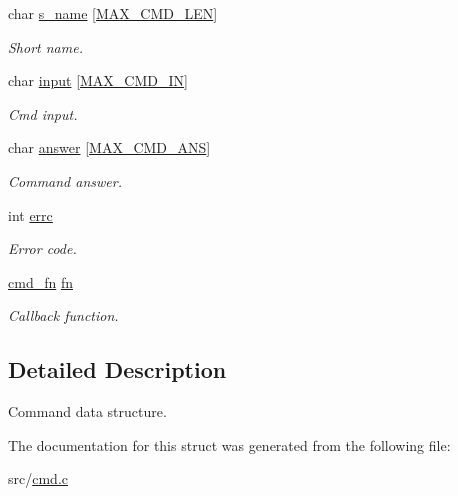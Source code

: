 \begin{DoxyCompactItemize}
\mbox{\label{struct__Cmd_ac7a8c09e258cb2b2f63d179943616d08}} 
char \hyperlink{struct__Cmd_ac7a8c09e258cb2b2f63d179943616d08}{s\+\_\+name} \mbox{[}\hyperlink{cmd_8h_a1eb73c104b484cf18752169509cebfe2}{M\+A\+X\+\_\+\+C\+M\+D\+\_\+\+L\+EN}\mbox{]}
\begin{DoxyCompactList}\small\item\em Short name. \end{DoxyCompactList}\item 
\mbox{\label{struct__Cmd_a3d023ded28ab2b9ec8daae3ebf1a3759}} 
char \hyperlink{struct__Cmd_a3d023ded28ab2b9ec8daae3ebf1a3759}{input} \mbox{[}\hyperlink{cmd_8h_a536329c6bdf286710c20c6dd9a0750cc}{M\+A\+X\+\_\+\+C\+M\+D\+\_\+\+IN}\mbox{]}
\begin{DoxyCompactList}\small\item\em Cmd input. \end{DoxyCompactList}\item 
\mbox{\label{struct__Cmd_a143c62700ed611e1ff0d70611c76fa55}} 
char \hyperlink{struct__Cmd_a143c62700ed611e1ff0d70611c76fa55}{answer} \mbox{[}\hyperlink{cmd_8h_ab972c58772002197942552cc47b6b5cd}{M\+A\+X\+\_\+\+C\+M\+D\+\_\+\+A\+NS}\mbox{]}
\begin{DoxyCompactList}\small\item\em Command answer. \end{DoxyCompactList}\item 
\mbox{\label{struct__Cmd_a4f3acf8cfdc67548121c1989765cbbcf}} 
int \hyperlink{struct__Cmd_a4f3acf8cfdc67548121c1989765cbbcf}{errc}
\begin{DoxyCompactList}\small\item\em Error code. \end{DoxyCompactList}\item 
\mbox{\label{struct__Cmd_abfca5a0889206135702ed3e398079bad}} 
\hyperlink{cmd_8h_a78d7a8bd781b5514e6dd7e1253bb1907}{cmd\+\_\+fn} \hyperlink{struct__Cmd_abfca5a0889206135702ed3e398079bad}{fn}
\begin{DoxyCompactList}\small\item\em Callback function. \end{DoxyCompactList}\end{DoxyCompactItemize}


\subsection{Detailed Description}
Command data structure. 

The documentation for this struct was generated from the following file\+:\begin{DoxyCompactItemize}
\item 
src/\hyperlink{cmd_8c}{cmd.\+c}\end{DoxyCompactItemize}
